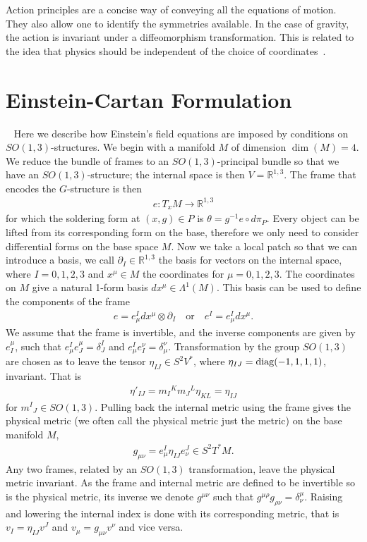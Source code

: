 \documentclass[10pt]{report}
\theoremstyle{definition}
\newcommand{\R}[0]{\mathbb{R}}
\begin{document}
Action principles are a concise way of conveying all the equations of motion. They also allow one to identify the symmetries available. In the case of gravity, the action is invariant under a diffeomorphism transformation. This is related to the idea that physics should be independent of the choice of coordinates~\cite{2018grav.book.....M}.

\section{Einstein-Cartan Formulation}~\label{sec:einstein-cartan-formulation}
Here we describe how Einstein's field equations are imposed by conditions on $SO(1,3)$-structures. We begin with a manifold $M$ of dimension $\dim(M) = 4$. We reduce the bundle of frames to an $SO(1,3)$-principal bundle so that we have an $SO(1,3)$-structure; the internal space is then $V = \R^{1,3}$. The frame that encodes the $G$-structure is then
\begin{align}
    e : T_x M \rightarrow \R^{1,3}
\end{align}
for which the soldering form at $(x,g) \in P$ is $\theta = g^{-1} e \circ d\pi_P$. Every object can be lifted from its corresponding form on the base, therefore we only need to consider differential forms on the base space $M$. Now we take a local patch so that we can introduce a basis, we call $\partial_I \in \R^{1,3}$ the basis for vectors on the internal space, where $I=0,1,2,3$ and $x^{\mu} \in M$ the coordinates for $\mu=0,1,2,3$. The coordinates on $M$ give a natural 1-form basis $dx^\mu \in \Lambda^1(M)$. This basis can be used to define the components of the frame 
\begin{align}
    e = e^I_\mu dx^\mu \otimes \partial_I \quad \textrm{or} \quad e^I = e^I_\mu dx^\mu.
\end{align}
We assume that the frame is invertible, and the inverse components are given by $e^\mu_I$, such that $e^I_\mu e^\mu_J = \delta^I_J$ and $e^I_\mu e_I^\nu = \delta_\mu^\nu$. Transformation by the group $SO(1,3)$ are chosen as to leave the tensor $\eta_{IJ} \in S^2 V^*$, where $\eta_{IJ} = {\rm diag}(-1,1,1,1)$, invariant. That is 
\begin{align}
    \eta'_{IJ} = m_I{}^K m_J{}^L \eta_{KL} = \eta_{IJ}
\end{align}
for $m^I{}_J \in SO(1,3)$. Pulling back the internal metric using the frame gives the physical metric (we often call the physical metric just the metric) on the base manifold $M$,
\begin{align}
    g_{\mu\nu} = e^I_\mu \eta_{IJ} e^J_\nu \in S^2 T^*M. \label{eq:tetrad-metric-from-tetrad}
\end{align}
Any two frames, related by an $SO(1,3)$ transformation, leave the physical metric invariant. As the frame and internal metric are defined to be invertible so is the physical metric, its inverse we denote $g^{\mu\nu}$ such that $g^{\mu\rho} g_{\rho\nu} = \delta^\mu_\nu$. Raising and lowering the internal index is done with its corresponding metric, that is $v_I = \eta_{IJ} v^J$ and $v_\mu = g_{\mu\nu} v^\nu$ and vice versa.
\end{document}
